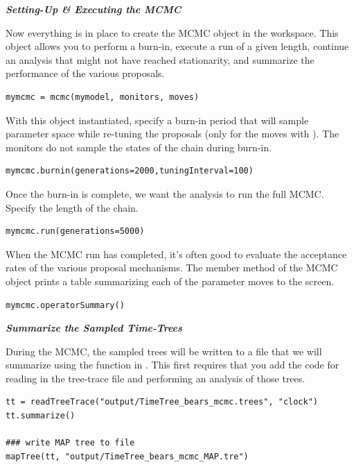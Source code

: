 \textbf{\textit{Setting-Up \& Executing the MCMC}}

Now everything is in place to create the MCMC object in the workspace.
This object allows you to perform a burn-in, execute a run of a given length, continue an analysis that might not have reached stationarity, and summarize the performance of the various proposals.
{\tt \begin{snugshade*}
\begin{lstlisting}
mymcmc = mcmc(mymodel, monitors, moves)
\end{lstlisting}
\end{snugshade*}}

With this object instantiated, specify a burn-in period that will sample parameter space while re-tuning the proposals (only for the moves with ). 
The monitors do not sample the states of the chain during burn-in.
{\tt \begin{snugshade*}
\begin{lstlisting}
mymcmc.burnin(generations=2000,tuningInterval=100)
\end{lstlisting}
\end{snugshade*}}

Once the burn-in is complete, we want the analysis to run the full MCMC. 
Specify the length of the chain. 
{\tt \begin{snugshade*}
\begin{lstlisting}
mymcmc.run(generations=5000)
\end{lstlisting}
\end{snugshade*}}

When the MCMC run has completed, it's often good to evaluate the acceptance rates of the various proposal mechanisms. 
The  member method of the MCMC object prints a table summarizing each of the parameter moves to the screen. 
{\tt \begin{snugshade*}
\begin{lstlisting}
mymcmc.operatorSummary()
\end{lstlisting}
\end{snugshade*}}

\textbf{\textit{Summarize the Sampled Time-Trees}}

During the MCMC, the sampled trees will be written to a file that we will summarize using the  function in \RevBayes.
This first requires that you add the code for reading in the tree-trace file and performing an analysis of those trees.
{\tt \begin{snugshade*}
\begin{lstlisting}
tt = readTreeTrace("output/TimeTree_bears_mcmc.trees", "clock")
tt.summarize()

### write MAP tree to file
mapTree(tt, "output/TimeTree_bears_mcmc_MAP.tre")
\end{lstlisting}
\end{snugshade*}}


